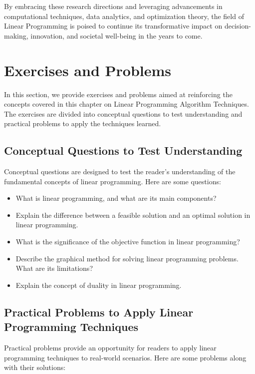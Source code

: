 \documentclass[12pt]{book} %
\begin{document}
By embracing these research directions and leveraging advancements in computational techniques, data analytics, and optimization theory, the field of Linear Programming is poised to continue its transformative impact on decision-making, innovation, and societal well-being in the years to come.


\section{Exercises and Problems}

In this section, we provide exercises and problems aimed at reinforcing the concepts covered in this chapter on Linear Programming Algorithm Techniques. The exercises are divided into conceptual questions to test understanding and practical problems to apply the techniques learned.

\subsection{Conceptual Questions to Test Understanding}

Conceptual questions are designed to test the reader's understanding of the fundamental concepts of linear programming. Here are some questions:

\begin{itemize}
    \item What is linear programming, and what are its main components?
    \item Explain the difference between a feasible solution and an optimal solution in linear programming.
    \item What is the significance of the objective function in linear programming?
    \item Describe the graphical method for solving linear programming problems. What are its limitations?
    \item Explain the concept of duality in linear programming.
\end{itemize}

\subsection{Practical Problems to Apply Linear Programming Techniques}

Practical problems provide an opportunity for readers to apply linear programming techniques to real-world scenarios. Here are some problems along with their solutions:
\end{document}
